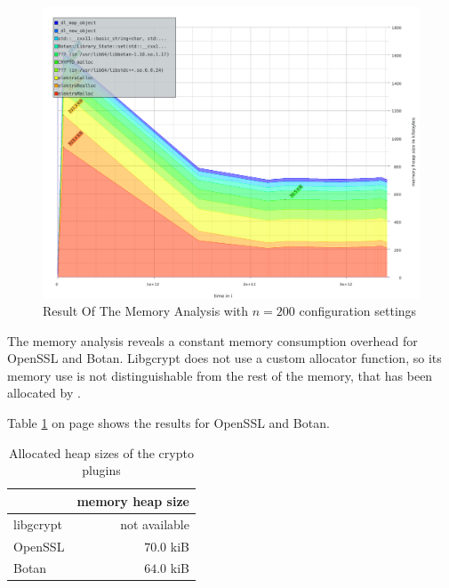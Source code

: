 \begin{figure}
\center
\caption{Result Of The Memory Analysis with $n = 200$ configuration settings}
\label{eval-massif-200}
\includegraphics[width=\columnwidth]{plots/massif_200.pdf}
\end{figure}

The memory analysis reveals a constant memory consumption overhead for OpenSSL and Botan.
Libgcrypt does not use a custom allocator function, so its memory use is not distinguishable from the rest of the memory, that has been allocated by \elektra .

Table \ref{eval-mem-res} on page \pageref{eval-mem-res} shows the results for OpenSSL and Botan.

\begin{table}[h]
\centering
\caption{Allocated heap sizes of the crypto plugins}
\label{eval-mem-res}
\begin{tabular}{l|r}
          & memory heap size \\ \hline
libgcrypt & not available    \\
OpenSSL   & $70.0$ kiB       \\
Botan     & $64.0$ kiB      
\end{tabular}
\end{table}


